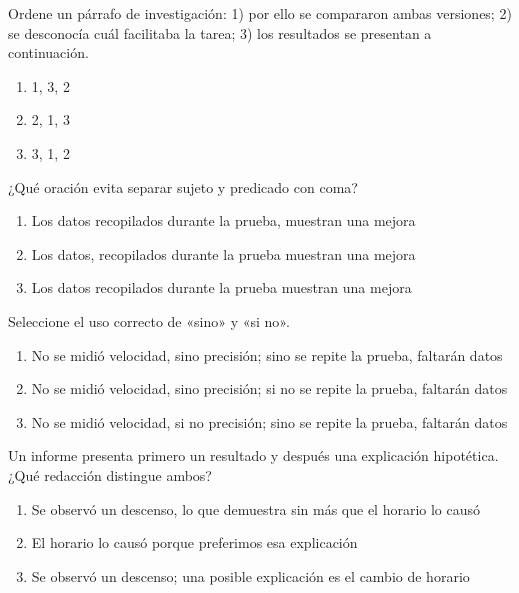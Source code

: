 \noindent\begin{minipage}{\linewidth}\setlength{\parskip}{4pt}\label{q:E-010}
Ordene un párrafo de investigación: 1) por ello se compararon ambas versiones; 2) se desconocía cuál facilitaba la tarea; 3) los resultados se presentan a continuación.
\begin{enumerate}[label=\Alph*),nosep]
\item 1, 3, 2
\item 2, 1, 3
\item 3, 1, 2
\end{enumerate}\end{minipage}\par\medskip

\noindent\begin{minipage}{\linewidth}\setlength{\parskip}{4pt}\label{q:E-011}
¿Qué oración evita separar sujeto y predicado con coma?
\begin{enumerate}[label=\Alph*),nosep]
\item Los datos recopilados durante la prueba, muestran una mejora
\item Los datos, recopilados durante la prueba muestran una mejora
\item Los datos recopilados durante la prueba muestran una mejora
\end{enumerate}\end{minipage}\par\medskip

\noindent\begin{minipage}{\linewidth}\setlength{\parskip}{4pt}\label{q:E-012}
Seleccione el uso correcto de «sino» y «si no».
\begin{enumerate}[label=\Alph*),nosep]
\item No se midió velocidad, sino precisión; sino se repite la prueba, faltarán datos
\item No se midió velocidad, sino precisión; si no se repite la prueba, faltarán datos
\item No se midió velocidad, si no precisión; sino se repite la prueba, faltarán datos
\end{enumerate}\end{minipage}\par\medskip

\noindent\begin{minipage}{\linewidth}\setlength{\parskip}{4pt}\label{q:E-013}
Un informe presenta primero un resultado y después una explicación hipotética. ¿Qué redacción distingue ambos?
\begin{enumerate}[label=\Alph*),nosep]
\item Se observó un descenso, lo que demuestra sin más que el horario lo causó
\item El horario lo causó porque preferimos esa explicación
\item Se observó un descenso; una posible explicación es el cambio de horario
\end{enumerate}\end{minipage}\par\medskip

